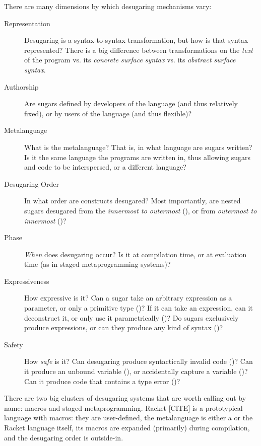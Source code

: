 There are many dimensions by which desugaring mechanisms vary:
\begin{description}
  \item[Representation] Desugaring is a syntax-to-syntax transformation, but
    how is that syntax represented? There is a big difference between
    transformations on the \emph{text} of the program vs. its
    \emph{concrete surface syntax} vs. its \emph{abstract surface
      syntax}.
  \item[Authorship] Are sugars defined by developers of the language (and thus
    relatively fixed), or by users of the language (and thus flexible)?
  \item[Metalanguage] What is the metalanguage? That is, in what language are sugars
    written? Is it the same language the programs are written in, thus
    allowing sugars and code to be interspersed, or a different
    language?
  \item[Desugaring Order] In what order are constructs desugared? Most
    importantly, are nested sugars desugared from the \emph{innermost
      to outermost} (), or from \emph{outermost to innermost}
    ()?
  \item[Phase] \emph{When} does desugaring occur? Is it at compilation time,
    or at evaluation time (as in staged metaprogramming systems)?
  \item[Expressiveness] How expressive is it? Can a sugar take an
    arbitrary expression as a parameter, or only a primitive type
    ()? If it can take an expression, can it
    deconstruct it, or only use it parametrically ()?
    Do sugars exclusively produce expressions, or can they produce any
    kind of syntax ()?
  \item[Safety] How \emph{safe} is it? Can desugaring produce
    syntactically invalid code ()? Can it produce an
    unbound variable (), or accidentally capture a
    variable ()? Can it produce code that contains a type
    error ()?
\end{description}



There are two big clusters of desugaring systems that are worth calling
out by name: macros and staged metaprogramming. Racket [CITE] is a
prototypical language with macros: they are user-defined, the
metalanguage is either a  or the Racket language itself, its
macros are expanded (primarily) during compilation, and the desugaring
order is outside-in.

